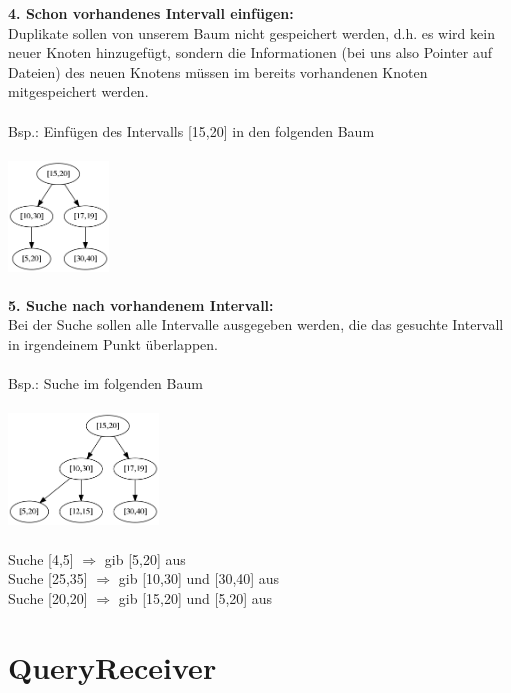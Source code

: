 \documentclass[a4paper,12pt]{scrartcl}
\begin{document}
\textbf{4. Schon vorhandenes Intervall einfügen:}\\
Duplikate sollen von unserem Baum nicht gespeichert werden, d.h. es wird kein neuer Knoten hinzugefügt, sondern die Informationen (bei uns also Pointer auf Dateien) des neuen Knotens müssen im bereits vorhandenen Knoten mitgespeichert werden.\\\\
Bsp.: Einfügen des Intervalls [15,20] in den folgenden Baum\\\\
\includegraphics[width=0.2\textwidth]{Testfaelle/1.png}\\\\\newpage
\textbf{5. Suche nach vorhandenem Intervall:}\\
Bei der Suche sollen alle Intervalle ausgegeben werden, die das gesuchte Intervall in irgendeinem Punkt überlappen.\\\\
Bsp.: Suche im folgenden Baum\\\\
\includegraphics[width=0.3\textwidth]{Testfaelle/2.png}\\\\Suche [4,5] $\Rightarrow$ gib [5,20] aus\\
Suche [25,35] $\Rightarrow$ gib [10,30] und [30,40] aus\\
Suche [20,20] $\Rightarrow$ gib [15,20] und [5,20] aus

\section{QueryReceiver}
\end{document}
